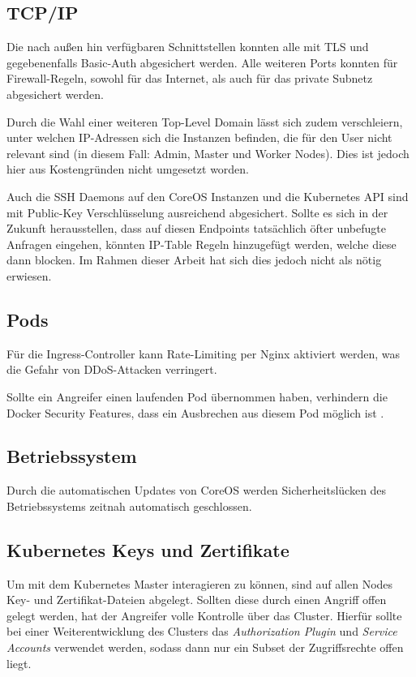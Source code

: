 \subsection{TCP/IP}

Die nach außen hin verfügbaren Schnittstellen konnten alle mit TLS
und gegebenenfalls Basic-Auth abgesichert werden.
Alle weiteren Ports konnten für Firewall-Regeln, sowohl für das Internet,
als auch für das private Subnetz abgesichert werden.

Durch die Wahl einer weiteren Top-Level Domain l\"asst sich zudem
verschleiern,
unter welchen IP-Adressen sich die Instanzen befinden,
die für den User nicht
relevant sind (in diesem Fall: Admin, Master und Worker Nodes).
Dies ist jedoch hier aus Kostengründen nicht
umgesetzt worden.

Auch die SSH Daemons auf den CoreOS Instanzen und die
Kubernetes API sind mit Public-Key
Verschlüsselung ausreichend abgesichert.
Sollte es sich in der Zukunft herausstellen, dass auf
diesen Endpoints tatsächlich öfter unbefugte Anfragen eingehen,
könnten IP-Table Regeln hinzugefügt werden, welche diese dann blocken.
Im Rahmen dieser Arbeit hat sich dies jedoch nicht als nötig erwiesen.

\subsection{Pods}

Für die Ingress-Controller kann Rate-Limiting per Nginx aktiviert
werden, was die Gefahr von DDoS-Attacken verringert.

Sollte ein Angreifer einen laufenden Pod übernommen haben,
verhindern die
Docker Security Features, dass ein Ausbrechen aus diesem Pod
möglich ist \cite{dockersec}.

\subsection{Betriebssystem}

Durch die automatischen Updates von CoreOS werden Sicherheitslücken des
Betriebssystems zeitnah automatisch geschlossen.

\subsection{Kubernetes Keys und Zertifikate}

Um mit dem Kubernetes Master interagieren zu können, sind auf allen Nodes
Key- und Zertifikat-Dateien abgelegt. Sollten
diese durch einen Angriff offen gelegt
werden, hat der Angreifer volle Kontrolle über das Cluster.
Hierfür sollte bei einer Weiterentwicklung des Clusters das
\emph{Authorization Plugin} und \emph{Service Accounts} verwendet werden, sodass
dann nur ein Subset der Zugriffsrechte offen liegt.

